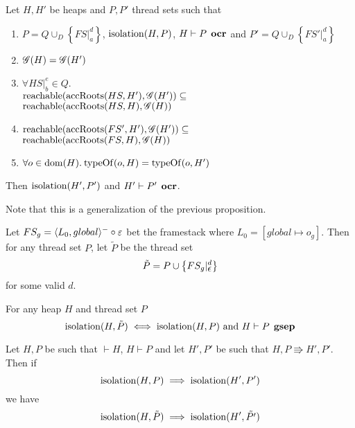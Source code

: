 \begin{proposition} \label{prop:simple_isolation_orc_gen}
  Let $H, H'$ be heaps and $P, P'$ thread sets such that
  \begin{enumerate}
    \item $P = Q \cup_D \left\{ FS|_a^d \right\}$, $\mbox{$\mathrm{isolation}$}{(H, P)}$, $H
      \vdash P \:\: \mbox{\bf ocr}$ and $P' = Q \cup_D \left\{ FS'|_a^d \right\}$
    \item $\mathscr{G}{(H)} = \mathscr{G}{(H')}$
    \item $\forall HS|_b^e \in Q.$ \\ 
      $\mbox{$\mathrm{reachable}$}{(\mbox{$\mathrm{accRoots}$}{(HS, H')}, \ensuremath{\mathscr{G}}{(H')})} \subseteq$ \\
      $\mbox{$\mathrm{reachable}$}{(\mbox{$\mathrm{accRoots}$}{(HS, H)}, \ensuremath{\mathscr{G}}{(H)})}$
    \item $\mbox{$\mathrm{reachable}$}{(\mbox{$\mathrm{accRoots}$}{(FS', H')}, \ensuremath{\mathscr{G}}{(H')})} \subseteq$ \\
      $\mbox{$\mathrm{reachable}$}{(\mbox{$\mathrm{accRoots}$}{(FS, H)}, \ensuremath{\mathscr{G}}{(H)})}$
    \item $\forall o \in \mbox{$\mathrm{dom}$}{(H)}. \: \mbox{$\mathrm{typeOf}$}{(o, H)} = \mbox{$\mathrm{typeOf}$}{(o, H')}$
  \end{enumerate}
  Then $\mbox{$\mathrm{isolation}$}{(H', P')}$ and $H' \vdash P' \:\: \mbox{\bf ocr}$.
\end{proposition}

\begin{remark}
  Note that this is a generalization of the previous proposition.
\end{remark}


\begin{definition}
  Let $FS_g = \mbox{$\langle L_0, global \rangle^{-}$} \circ \varepsilon$ bet the framestack where
  $L_0 = [global \mapsto o_g]$. Then for any thread set $P$, let $\tilde{P}$ be the
  thread set
  \begin{equation*}
    \tilde{P} = P \cup \left\{ FS_g|_{\mbox{$\epsilon$}}^d \right\}
  \end{equation*}
  for some valid $d$.
\end{definition}

\begin{proposition} \label{prop:gsep_eq}
  For any heap $H$ and thread set $P$
  \begin{equation*}
    \mbox{$\mathrm{isolation}$}{(H, \tilde{P})} \iff \mbox{$\mathrm{isolation}$}{(H, P)} \text{ and } H \vdash P
    \:\: \mbox{\bf gsep} 
  \end{equation*}
\end{proposition}

\begin{proposition} \label{prop:gsep_simple}
  Let $H, P$ be such that $\vdash H$, $H \vdash P$ %
  and let $H', P'$ be such that $H, P \Rrightarrow H', P'$. Then if
  \begin{equation*}
    \mbox{$\mathrm{isolation}$}{(H,P)} \implies \mbox{$\mathrm{isolation}$}{(H', P')}
  \end{equation*}
  we have
  \begin{equation*}
    \mbox{$\mathrm{isolation}$}{(H, \tilde{P})} \implies \mbox{$\mathrm{isolation}$}{(H', \tilde{P'})}
  \end{equation*}
\end{proposition}

